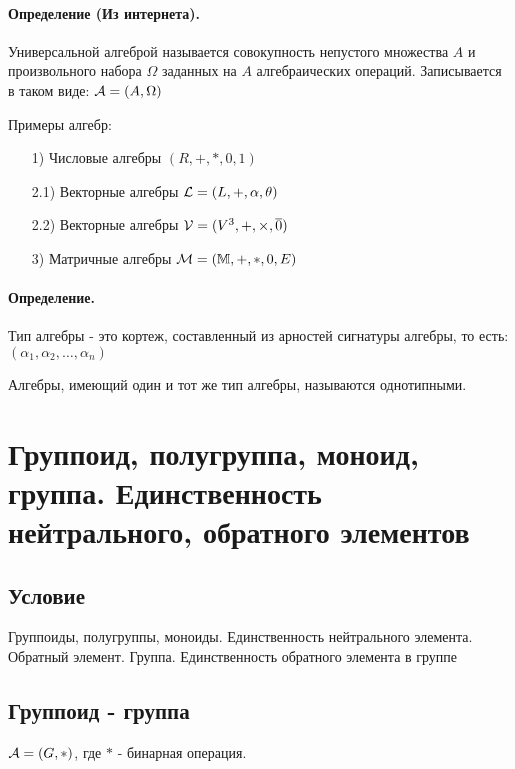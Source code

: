 \documentclass{report}
\begin{document}
\medskip

\paragraph*{Определение (Из интернета).}
Универсальной алгеброй называется совокупность непустого множества $A$
и произвольного набора $\Omega$ заданных на $A$ алгебраических операций.
Записывается в таком виде: ${\cal A} = (A, \Omega)$

\medskip

Примеры алгебр:
\begin{itemize}
	\item[1)] Числовые алгебры $(R, +, *, 0, 1)$
	\item[2.1)] Векторные алгебры ${\cal L} = (L, +, \alpha, \theta)$\newline
	\item[2.2)] Векторные алгебры ${\cal V} = (V^{3}, +, \times, \overline{0})$
	\item[3)] Матричные алгебры ${\cal M} = (\mathbb{M}, +, *, 0, E)$
\end{itemize}

\medskip

\paragraph*{Определение.}
Тип алгебры - это кортеж, составленный из арностей сигнатуры алгебры, то есть:
$(\alpha_{1}, \alpha_{2}, \ldots, \alpha_{n})$

Алгебры, имеющий один и тот же тип алгебры, называются однотипными.

\newpage

\section{Группоид, полугруппа, моноид, группа. Единственность нейтрального, обратного элементов}
\subsection{Условие}
Группоиды, полугруппы, моноиды. Единственность нейтрального элемента. Обратный
элемент. Группа. Единственность обратного элемента в группе

\subsection{Группоид - группа}
${\cal A} = (G, *)$, где $*$ - бинарная операция.
\end{document}
